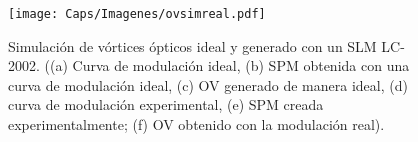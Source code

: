 
\begin{figure}[!ht]
  \centering
    \texttt{[image: Caps/Imagenes/ovsimreal.pdf]}
  \caption[Simulación de OVs ideales y generados con un LC-2002.]{Simulación de vórtices ópticos ideal y generado con un SLM LC-2002. ((a) Curva de modulación ideal, (b) SPM obtenida con una curva de modulación ideal, (c) OV generado de manera ideal, (d) curva de modulación experimental, (e) SPM creada experimentalmente; (f) OV obtenido con la modulación real).}
  \label{fig:voslm}
\end{figure}

